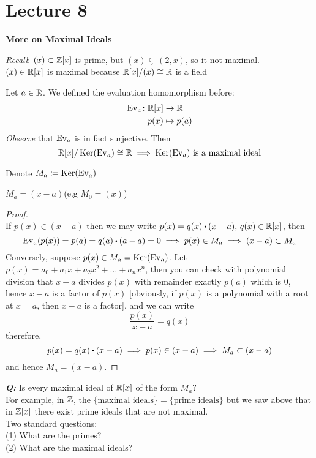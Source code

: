 \documentclass[../Main.tex]{subfiles}
\begin{document}
\chapter{Lecture 8}
\underline{\textbf{\Large More on Maximal Ideals}}

\textit{Recall}: $(x) \subset \mathbb{Z}[x]$ is prime, but $(x)\subsetneq (2,x)$, so it not maximal.\\
$(x)\in \mathbb{R}[x]$ is maximal because $\mathbb{R}[x]/(x) \cong \mathbb{R}$ is a field

\begin{example}
	Let $a\in \mathbb{R}$. We defined the evaluation homomorphism before:
	\begin{align*}
	\operatorname{Ev}_a\colon \mathbb{R}[x] &\to \mathbb{R} \\
	p(x) &\mapsto p(a)
	\end{align*}
	\textit{Observe} that $\operatorname{Ev}_a$ is in fact surjective. Then
	\[\mathbb{R}[x]/\operatorname{Ker}(\operatorname{Ev}_a) \cong \mathbb{R} \implies \operatorname{Ker}(\operatorname{Ev}_a) \text{ is a maximal ideal}\]
\end{example}
	Denote $M_a\coloneqq \operatorname{Ker}(\operatorname{Ev}_a)$
	\begin{claim}
		$M_a = (x-a)$\quad (e.g $M_0 =(x)$)
	\end{claim}
	\begin{proof}~\\
		If $p(x) \in (x-a)$ then we may write $p(x)=q(x)\rdot (x-a),\, q(x)\in \R[x]$, then
		\[\ev_a(p(x)) = p(a) = q(a)\rdot (a-a)=0 \implies p(x)\in M_a \implies (x-a) \subset M_a\] 
		Conversely, suppose $p(x) \in M_a = \operatorname{Ker}(\operatorname{Ev}_a)$. Let $p(x) = a_0 + a_1x+a_2x^2+\dots+a_nx^n$, then you can check with polynomial division that $x-a$ divides $p(x)$ with remainder exactly $p(a)$ which is $0$, hence $x-a$ is a factor of $p(x)$ [obviously, if $p(x)$ is a polynomial with a root at $x=a$, then $x-a$ is a factor], and we can write
		\[\frac{p(x)}{x-a} = q(x)\]
		therefore,
		\[p(x)=q(x)\rdot (x-a)\implies p(x) \in (x-a) \implies M_a \subset (x-a) \]
		and hence $M_a =(x-a)$.
	\end{proof}
\textbf{\textit{Q:}} Is every maximal ideal of $\mathbb{R}[x]$ of the form $M_a$?\\
For example, in $\mathbb{Z}$, the $\{\text{maximal ideals}\} =\{\text{prime ideals}\}$ but we saw above that in $\mathbb{Z}[x]$ there exist prime ideals that are not maximal.\\
Two standard questions:\\
(1) What are the primes?\\
(2) What are the maximal ideals?
\end{document}
